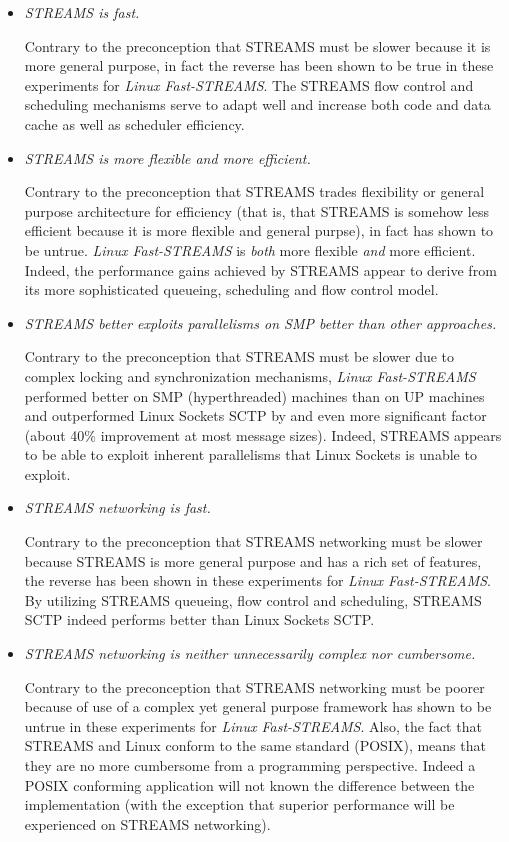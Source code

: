 \documentclass[letterpaper,final,notitlepage,twocolumn,10pt,twoside]{article}
\begin{document}
\begin{itemize}

\item \textit{STREAMS is fast.}

Contrary to the preconception that STREAMS must be slower because it is more
general purpose, in fact the reverse has been shown to be true in these
experiments for \textsl{Linux Fast-STREAMS}.  The STREAMS flow control and
scheduling mechanisms serve to adapt well and increase both code and data
cache as well as scheduler efficiency.

\item \textit{STREAMS is more flexible {\em and} more efficient.}

Contrary to the preconception that STREAMS trades flexibility or general
purpose architecture for efficiency (that is, that STREAMS is somehow less
efficient because it is more flexible and general purpse), in fact has shown
to be untrue.  \textsl{Linux Fast-STREAMS} is {\em both} more flexible {\em
and} more efficient.  Indeed, the performance gains achieved by  STREAMS
appear to derive from its more sophisticated queueing, scheduling and flow
control model.

\item \textit{STREAMS better exploits parallelisms on SMP better than other approaches.}

Contrary to the preconception that STREAMS must be slower due to complex
locking and synchronization mechanisms, \textsl{Linux Fast-STREAMS} performed
better on SMP (hyperthreaded) machines than on UP machines and outperformed
Linux Sockets SCTP by and even more significant factor (about 40\% improvement at
most message sizes).  Indeed, STREAMS appears to be able to exploit inherent
parallelisms that Linux Sockets is unable to exploit.

\item \textit{STREAMS networking is fast.}

Contrary to the preconception that STREAMS networking must be slower because
STREAMS is more general purpose and has a rich set of features, the reverse
has been shown in these experiments for \textsl{Linux Fast-STREAMS}.  By
utilizing STREAMS queueing, flow control and scheduling, STREAMS SCTP indeed
performs better than Linux Sockets SCTP.

\item \textit{STREAMS networking is neither unnecessarily complex nor cumbersome.}

Contrary to the preconception that STREAMS networking must be poorer because
of use of a complex yet general purpose framework has shown to be untrue in
these experiments for \textsl{Linux Fast-STREAMS}.  Also, the fact that
STREAMS and Linux conform to the same standard (POSIX), means that they are no
more cumbersome from a programming perspective.  Indeed a POSIX conforming
application will not known the difference between the implementation (with the
exception that superior performance will be experienced on STREAMS
networking).

\end{itemize}
\end{document}
